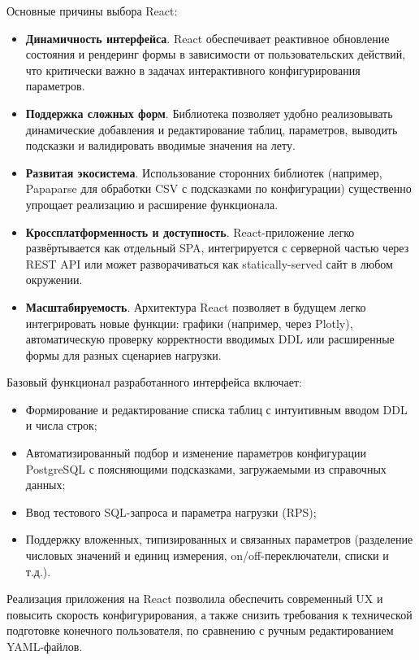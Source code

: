 Основные причины выбора React:

\begin{itemize} 
  \item \textbf{Динамичность интерфейса}. React обеспечивает реактивное обновление состояния и рендеринг формы в зависимости от пользовательских действий, что критически важно в задачах интерактивного конфигурирования параметров. 
  \item \textbf{Поддержка сложных форм}. Библиотека позволяет удобно реализовывать динамические добавления и редактирование таблиц, параметров, выводить подсказки и валидировать вводимые значения на лету. 
  \item \textbf{Развитая экосистема}. Использование сторонних библиотек (например, Papaparse для обработки CSV с подсказками по конфигурации) существенно упрощает реализацию и расширение функционала. 
  \item \textbf{Кроссплатформенность и доступность}. React-приложение легко развёртывается как отдельный SPA, интегрируется с серверной частью через REST API или может разворачиваться как statically-served сайт в любом окружении. 
  \item \textbf{Масштабируемость}. Архитектура React позволяет в будущем легко интегрировать новые функции: графики (например, через Plotly), автоматическую проверку корректности вводимых DDL или расширенные формы для разных сценариев нагрузки. 
\end{itemize}

Базовый функционал разработанного интерфейса включает:

\begin{itemize} \item Формирование и редактирование списка таблиц с интуитивным вводом DDL и числа строк; \item Автоматизированный подбор и изменение параметров конфигурации PostgreSQL с поясняющими подсказками, загружаемыми из справочных данных; \item Ввод тестового SQL-запроса и параметра нагрузки (RPS); \item Поддержку вложенных, типизированных и связанных параметров (разделение числовых значений и единиц измерения, on/off-переключатели, списки и т.д.). \end{itemize}

Реализация приложения на React позволила обеспечить современный UX и повысить скорость конфигурирования, а также снизить требования к технической подготовке конечного пользователя, по сравнению с ручным редактированием YAML-файлов.

